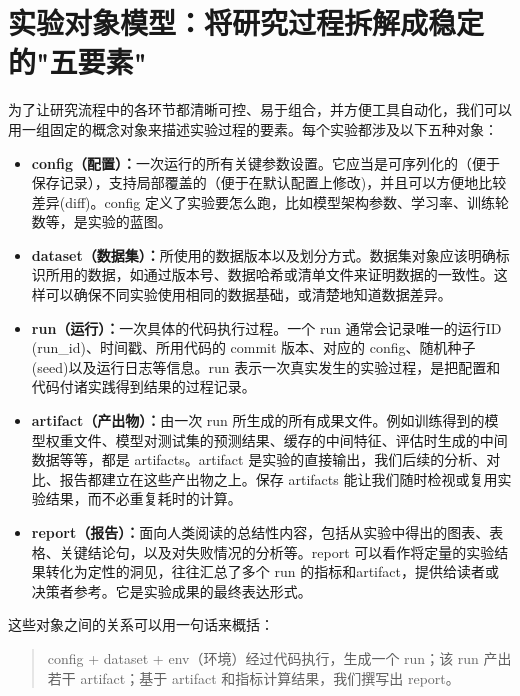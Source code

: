 \section{实验对象模型：将研究过程拆解成稳定的"五要素"}

为了让研究流程中的各环节都清晰可控、易于组合，并方便工具自动化，我们可以用一组固定的概念对象来描述实验过程的要素。每个实验都涉及以下五种对象：

\begin{itemize}
  \item \textbf{config（配置）：}一次运行的所有关键参数设置。它应当是可序列化的（便于保存记录），支持局部覆盖的（便于在默认配置上修改)，并且可以方便地比较差异(diff)。config 定义了实验要怎么跑，比如模型架构参数、学习率、训练轮数等，是实验的蓝图。

  \item \textbf{dataset（数据集）：}所使用的数据版本以及划分方式。数据集对象应该明确标识所用的数据，如通过版本号、数据哈希或清单文件来证明数据的一致性。这样可以确保不同实验使用相同的数据基础，或清楚地知道数据差异。

  \item \textbf{run（运行）：}一次具体的代码执行过程。一个 run 通常会记录唯一的运行ID (run\_id)、时间戳、所用代码的 commit 版本、对应的 config、随机种子(seed)以及运行日志等信息。run 表示一次真实发生的实验过程，是把配置和代码付诸实践得到结果的过程记录。

  \item \textbf{artifact（产出物）：}由一次 run 所生成的所有成果文件。例如训练得到的模型权重文件、模型对测试集的预测结果、缓存的中间特征、评估时生成的中间数据等等，都是 artifacts。artifact 是实验的直接输出，我们后续的分析、对比、报告都建立在这些产出物之上。保存 artifacts 能让我们随时检视或复用实验结果，而不必重复耗时的计算。

  \item \textbf{report（报告）：}面向人类阅读的总结性内容，包括从实验中得出的图表、表格、关键结论句，以及对失败情况的分析等。report 可以看作将定量的实验结果转化为定性的洞见，往往汇总了多个 run 的指标和artifact，提供给读者或决策者参考。它是实验成果的最终表达形式。
\end{itemize}

这些对象之间的关系可以用一句话来概括：

\begin{quote}
config + dataset + env（环境）经过代码执行，生成一个 run；该 run 产出若干 artifact；基于 artifact 和指标计算结果，我们撰写出 report。
\end{quote}

